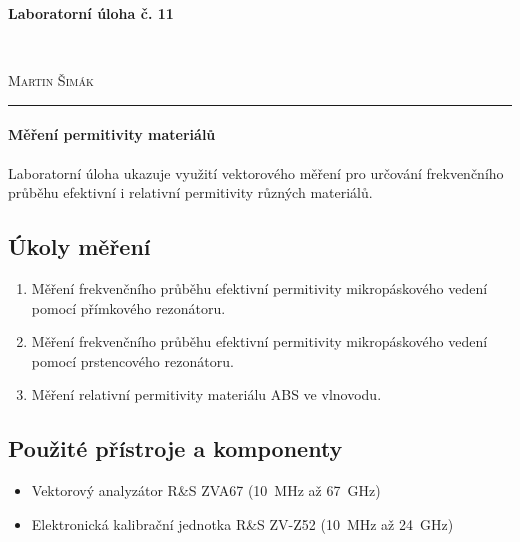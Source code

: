 \documentclass[11pt,a4paper]{article}
\begin{document}

\begin{center}
    {\LARGE\textbf{Laboratorní úloha č. 11}}\\[3mm]
    \begin{minipage}{0.4\textwidth}
        \begin{flushleft}
            \textsc{}
        \end{flushleft}
    \end{minipage}
    ~
    \begin{minipage}{0.4\textwidth}
        \begin{flushright}
            \textsc{Martin Šimák}
        \end{flushright}
    \end{minipage}
    \noindent\rule{14.5cm}{0.4pt}
\end{center}

\paragraph*{Měření permitivity materiálů} Laboratorní úloha ukazuje využití vektorového měření pro určování frekvenčního průběhu efektivní i relativní permitivity různých materiálů.

\subsection*{Úkoly měření}
\begin{enumerate}
    \item Měření frekvenčního průběhu efektivní permitivity mikropáskového vedení pomocí přímkového 
    rezonátoru.
    \item Měření frekvenčního průběhu efektivní permitivity mikropáskového vedení pomocí prstencového rezonátoru.
    \item Měření relativní permitivity materiálu ABS ve vlnovodu.
\end{enumerate}

\subsection*{Použité přístroje a komponenty}
\begin{itemize}
    \item Vektorový analyzátor R\&S ZVA67 (10~MHz až 67~GHz)
    \item Elektronická kalibrační jednotka R\&S ZV-Z52 (10~MHz až 24~GHz)
\end{itemize}
\end{document}
